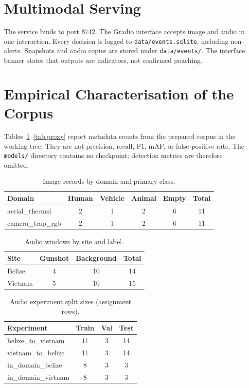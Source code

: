 \documentclass[conference]{IEEEtran}
\begin{document}
\section{Multimodal Serving}
The service binds to port $8742$. The Gradio interface accepts image and audio in one interaction. Every decision is logged to \texttt{data/events.sqlite}, including non-alerts. Snapshots and audio copies are stored under \texttt{data/events/}. The interface banner states that outputs are indicators, not confirmed poaching.

\section{Empirical Characterisation of the Corpus}
Tables~\ref{tab:img}--\ref{tab:proxy} report metadata counts from the prepared corpus in the working tree. They are not precision, recall, F1, mAP, or false-positive rate. The \texttt{models/} directory contains no checkpoint; detection metrics are therefore omitted.

\begin{table}[t]
\caption{Image records by domain and primary class.}
\label{tab:img}
\centering
\begin{tabular}{@{}lccccc@{}}
\toprule
Domain & Human & Vehicle & Animal & Empty & Total \\
\midrule
aerial\_thermal & 2 & 1 & 2 & 6 & 11 \\
camera\_trap\_rgb & 2 & 1 & 2 & 6 & 11 \\
\bottomrule
\end{tabular}
\end{table}

\begin{table}[t]
\caption{Audio windows by site and label.}
\label{tab:aud}
\centering
\begin{tabular}{@{}lccc@{}}
\toprule
Site & Gunshot & Background & Total \\
\midrule
Belize & 4 & 10 & 14 \\
Vietnam & 5 & 10 & 15 \\
\bottomrule
\end{tabular}
\end{table}

\begin{table}[t]
\caption{Audio experiment split sizes (assignment rows).}
\label{tab:split}
\centering
\begin{tabular}{@{}lccc@{}}
\toprule
Experiment & Train & Val & Test \\
\midrule
belize\_to\_vietnam & 11 & 3 & 14 \\
vietnam\_to\_belize & 11 & 3 & 14 \\
in\_domain\_belize & 8 & 3 & 3 \\
in\_domain\_vietnam & 8 & 3 & 3 \\
\bottomrule
\end{tabular}
\end{table}
\end{document}
